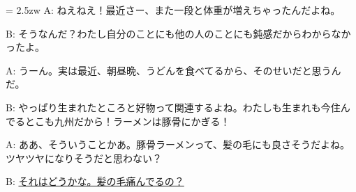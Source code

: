 \documentclass[11pt]{amsart}
\title{}
\author{}
\newenvironment{hangall}[1]{\hangindent = 2.5zw\everypar{\hangindent = 2.5zw}}{}
\begin{document}
\maketitle
\begin{hangall}{}%
A: ねえねえ！最近さー、また一段と体重が増えちゃったんだよね。

B: そうなんだ？わたし自分のことにも他の人のことにも鈍感だからわからなかったよ。

A: うーん。実は最近、朝昼晩、うどんを食べてるから、そのせいだと思うんだ。

B: やっぱり生まれたところと好物って関連するよね。わたしも生まれも今住んでるとこも九州だから！ラーメンは豚骨にかぎる！

A: ああ、そういうことかあ。豚骨ラーメンって、髪の毛にも良さそうだよね。ツヤツヤになりそうだと思わない？

B: \ul{それはどうかな。髪の毛痛んでるの？}\end{hangall}
\end{document}
